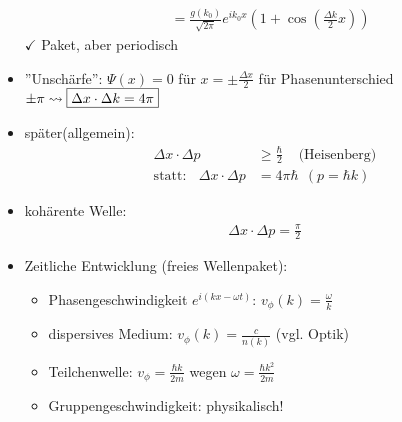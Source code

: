 \begin{itemize}
\begin{align*}
&=\frac{g(k_0)}{\sqrt{2\pi}}e^{ik_0x}\left(1+\cos\left(\frac{\Delta k}{2}x\right)\right)
							\end{align*}
					$\checkmark$ Paket, aber periodisch
					\item ''Unschärfe'': $\Psi(x)=0$ für $x=\pm\frac{\Delta x}{2}$ für Phasenunterschied $\pm\pi\\\leadsto\boxed{\Delta x\cdot\Delta k=4\pi}$
					\item später(allgemein):
							\begin{align*}
							\Delta x\cdot\Delta p&\geq\frac{\hbar}{2}~~~~~\text{(Heisenberg)}\\
							\text{statt:}~~~~\Delta x\cdot\Delta p&=4\pi\hbar~~(p=\hbar k)
							\end{align*}
					\item kohärente Welle:
							\begin{align*}
							\Delta x\cdot\Delta p=\frac{\pi}{2}
							\end{align*}
					\item Zeitliche Entwicklung (freies Wellenpaket):
							\begin{itemize}
							\item Phasengeschwindigkeit $e^{i(kx-\omega t)}$: $v_{\phi}(k)=									\frac{\omega}{k}$
							\item dispersives Medium: $v_{\phi}(k)=\frac{c}{n(k)}$ (vgl. Optik)
							\item Teilchenwelle: $v_{\phi}=\frac{\hbar k}{2m}$ wegen $\omega=\frac{\hbar k^2}{2m}$
							\item Gruppengeschwindigkeit: physikalisch! 


\end{itemize}
\end{itemize}
